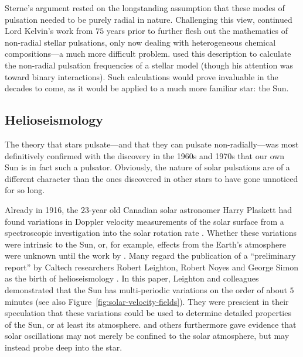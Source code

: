 Sterne's argument rested on the longstanding assumption that these modes of pulsation needed to be purely radial in nature. 
Challenging this view, \citet{1938ApJ....88..189P} continued Lord Kelvin's work from $75$ years prior to further flesh out the mathematics of non-radial stellar pulsations, only now dealing with heterogeneous chemical compositions---a much more difficult problem. 
\citet{1941MNRAS.101..367C} used this description to calculate the non-radial pulsation frequencies of a stellar model (though his attention was toward binary interactions). %
Such calculations would prove invaluable in the decades to come, as it would be applied to a much more familiar star: the Sun. %









\subsection{Helioseismology} 
The theory that stars pulsate---and that they can pulsate non-radially---was most definitively confirmed with the discovery in the 1960s and 1970s that our own Sun is in fact such a pulsator. 
Obviously, the nature of solar pulsations are of a different character than the ones discovered in other stars to have gone unnoticed for so long. 

Already in 1916, the $23$-year old Canadian solar astronomer Harry Plaskett had found variations in Doppler velocity measurements of the solar surface from a spectroscopic investigation into the solar rotation rate \citep{1916ApJ....43..145P}. 
Whether these variations were intrinsic to the Sun, or, for example, effects from the Earth's atmosphere were unknown until the work by \citet{1954MNRAS.114...17H, 1956MNRAS.116...38H}. 
Many regard the publication of a ``preliminary report'' by Caltech researchers Robert Leighton, Robert Noyes and George Simon as the birth of helioseismology \citep{1962ApJ...135..474L}. 
In this paper, Leighton and colleagues demonstrated that the Sun has multi-periodic variations on the order of about $5$ minutes (see also Figure~\ref{fig:solar-velocity-fields}). 
They were prescient in their speculation that these variations could be used to determine detailed properties of the Sun, or at least its atmosphere. 
\citet{1968ApJ...152..557F} and others furthermore gave evidence that solar oscillations may not merely be confined to the solar atmosphere, but may instead probe deep into the star. 



